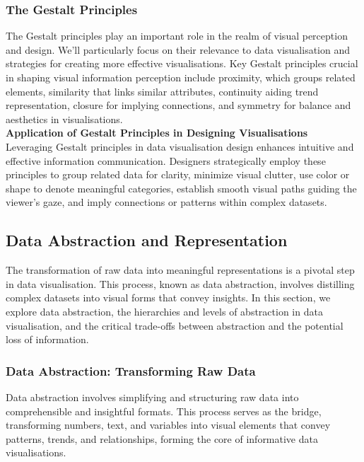 \documentclass{article}\usepackage[]{graphicx}\usepackage[]{xcolor}
\begin{document}
\subsubsection{The Gestalt Principles}
The Gestalt principles play an important role in the realm of visual perception and design. We'll particularly focus on their relevance to data visualisation and strategies for creating more effective visualisations. Key Gestalt principles crucial in shaping visual information perception include proximity, which groups related elements, similarity that links similar attributes, continuity aiding trend representation, closure for implying connections, and symmetry for balance and aesthetics in visualisations.\\

\noindent \textbf{Application of Gestalt Principles in Designing Visualisations}\\
Leveraging Gestalt principles in data visualisation design enhances intuitive and effective information communication. Designers strategically employ these principles to group related data for clarity, minimize visual clutter, use color or shape to denote meaningful categories, establish smooth visual paths guiding the viewer's gaze, and imply connections or patterns within complex datasets.


\subsection{Data Abstraction and Representation}
The transformation of raw data into meaningful representations is a pivotal step in data visualisation. This process, known as data abstraction, involves distilling complex datasets into visual forms that convey insights. In this section, we explore data abstraction, the hierarchies and levels of abstraction in data visualisation, and the critical trade-offs between abstraction and the potential loss of information.

\subsubsection{Data Abstraction: Transforming Raw Data}
Data abstraction involves simplifying and structuring raw data into comprehensible and insightful formats. This process serves as the bridge, transforming numbers, text, and variables into visual elements that convey patterns, trends, and relationships, forming the core of informative data visualisations.
\end{document}
